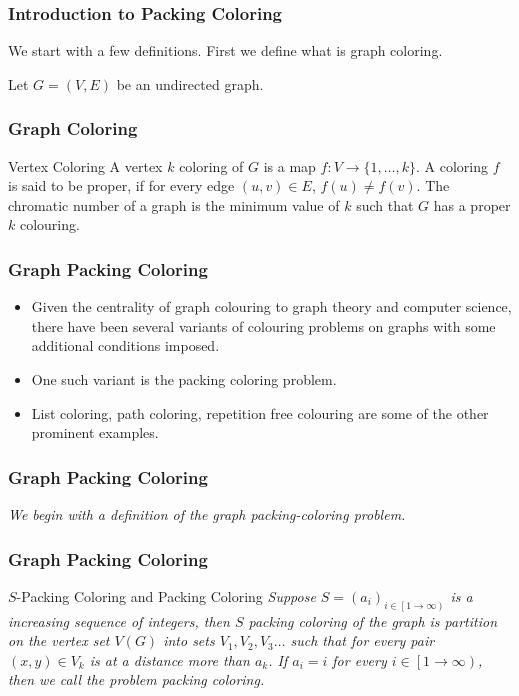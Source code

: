 \begin{frame}
    \frametitle{Introduction to Packing Coloring}
    
    We start with a few definitions. First we define what is graph coloring.\pause

    Let $G= (V,E)$ be an undirected graph.\pause
\end{frame}


\begin{frame}
    \frametitle{Graph Coloring}

    \begin{define}{Vertex Coloring}{}
        A vertex $k$ coloring of $G$ is a map $f: V \to \{1,\ldots, k\}$. A coloring $f$ is said to be proper, if for every edge $(u,v)\in E$, $f(u) \neq f(v)$. The chromatic number of a graph is the minimum value of $k$ such that $G$ has a proper $k$ colouring.
    \end{define}

\end{frame}

\begin{frame}
    \frametitle{Graph Packing Coloring}


    \begin{itemize}
        \item Given the centrality of graph colouring to graph theory and computer science, there have been several variants of colouring problems on graphs with some additional conditions imposed.\pause
        \item One such variant is the packing coloring problem.\pause
        \item List coloring, path coloring, repetition free colouring are some of the other prominent examples.
    \end{itemize}
\end{frame}

\begin{frame}
    \frametitle{Graph Packing Coloring}
    \textit{We  begin with a definition of the  graph packing-coloring problem.}
\end{frame}

\begin{frame}
    \frametitle{Graph Packing Coloring}

    \begin{define}{$S$-Packing Coloring and Packing Coloring}{}
        \textit{Suppose $S = (a_i)_{i \in \left[1 \to \infty\right)}$ is a increasing sequence of integers, then $S$ packing coloring of the graph is partition on the vertex set $V(G)$ into sets $V_1, V_2, V_3 \dots$ such that for every pair $(x, y) \in V_k$ is at a distance more than $a_k$. If $a_i = i$ for every $i \in \left[1 \to \infty\right)$, then we call the problem packing coloring.}
    \end{define}

\end{frame}


